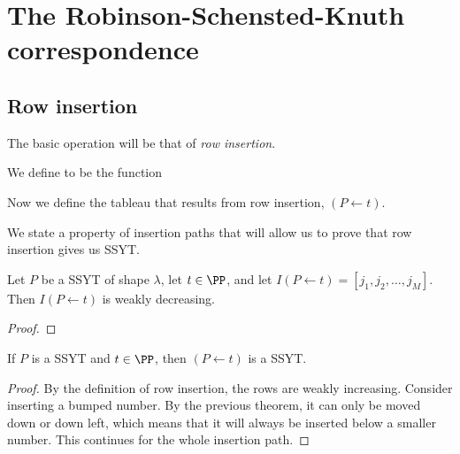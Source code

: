 \documentclass{article}
\begin{document}
\section{The Robinson-Schensted-Knuth correspondence}

\subsection{Row insertion}


The basic operation will be that of \textit{row insertion}.

\begin{definition}
    \ytabsmallbox
    We define  to be the function 

    \begin{algorithm}[H]
        \SetAlgoLined
    \end{algorithm}
\end{definition}

Now we define the tableau that results from row insertion, $(P \leftarrow t)$.

We state a property of insertion paths that will allow us to prove that row insertion gives us SSYT.

\begin{theorem}
    Let $P$ be a SSYT of shape $\lambda$, let $t \in \PP$, and let $I(P\leftarrow t) = [j_1,j_2,\ldots,j_M]$. Then $I(P\leftarrow t)$ is weakly decreasing.
\end{theorem}

\begin{proof}
\end{proof}

\begin{corollary}\label{InsertionPreservesSSYT}
    If $P$ is a SSYT and $t \in \PP$, then $(P \leftarrow t)$ is a SSYT.
\end{corollary}

\begin{proof}
    By the definition of row insertion, the rows are weakly increasing. Consider inserting a bumped number. By the previous theorem, it can only be moved down or down left, which means that it will always be inserted below a smaller number. This continues for the whole insertion path.
\end{proof}
\end{document}
